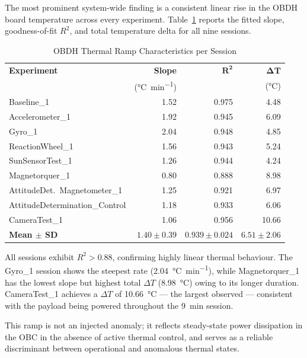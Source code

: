 \documentclass[conference]{IEEEtran}
\begin{document}
The most prominent system-wide finding is a consistent linear rise in
the OBDH board temperature across every experiment.
Table~\ref{tab:obdh} reports the fitted slope, goodness-of-fit $R^2$,
and total temperature delta for all nine sessions.

\begin{table}[t]
\caption{OBDH Thermal Ramp Characteristics per Session}
\label{tab:obdh}
\centering
\footnotesize
\begin{tabular}{@{}lrrr@{}}
\toprule
\textbf{Experiment} & \textbf{Slope} & $\boldsymbol{R^2}$ & $\boldsymbol{\Delta T}$ \\
                    & (\si{\celsius\per\minute}) &  & (\si{\celsius}) \\
\midrule
Baseline\_1                    & 1.52 & 0.975 & 4.48 \\
Accelerometer\_1               & 1.92 & 0.945 & 6.09 \\
Gyro\_1                        & 2.04 & 0.948 & 4.85 \\
ReactionWheel\_1               & 1.56 & 0.943 & 5.24 \\
SunSensorTest\_1               & 1.26 & 0.944 & 4.24 \\
Magnetorquer\_1                & 0.80 & 0.888 & 8.98 \\
AttitudeDet.\ Magnetometer\_1  & 1.25 & 0.921 & 6.97 \\
AttitudeDetermination\_Control & 1.18 & 0.933 & 6.06 \\
CameraTest\_1                  & 1.06 & 0.956 & 10.66 \\
\midrule
\textbf{Mean $\pm$ SD} & $1.40 \pm 0.39$ & $0.939 \pm 0.024$ & $6.51 \pm 2.06$ \\
\bottomrule
\end{tabular}
\end{table}

All sessions exhibit $R^2 > 0.88$, confirming highly linear thermal
behaviour.  The Gyro\_1 session shows the steepest rate
(\SI{2.04}{\celsius\per\minute}), while Magnetorquer\_1 has the
lowest slope but highest total $\Delta T$ (\SI{8.98}{\celsius}) owing
to its longer duration.  CameraTest\_1 achieves a $\Delta T$ of
\SI{10.66}{\celsius} — the largest observed — consistent with the
payload being powered throughout the \SI{9}{\minute} session.

This ramp is not an injected anomaly; it reflects steady-state power
dissipation in the OBC in the absence of active thermal control, and
serves as a reliable discriminant between operational and
anomalous thermal states.
\end{document}
